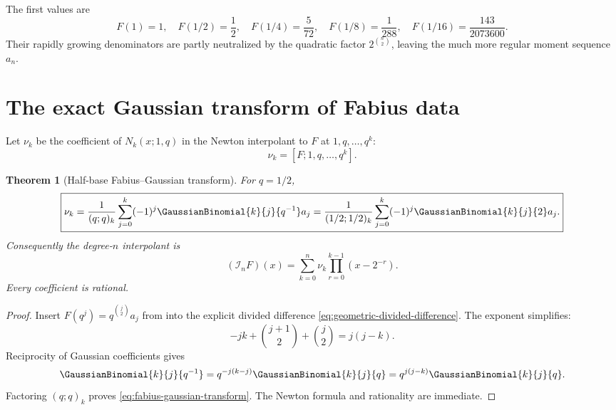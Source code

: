 \documentclass[11pt,oneside]{book}
\numberwithin{equation}{chapter}
\newtheorem{theorem}{Theorem}[chapter]
\theoremstyle{definition}
\theoremstyle{remark}
\newcommand{\twobinom}[2]{\GaussianBinomial{#1}{#2}{2}}
\newcommand{\Interp}{\mathcal I}
\begin{document}
The first values are
\begin{equation}
 F(1)=1,
 \quad F(1/2)=\frac12,
 \quad F(1/4)=\frac5{72},
 \quad F(1/8)=\frac1{288},
 \quad F(1/16)=\frac{143}{2073600}.
 \label{eq:first-fabius-values}
\end{equation}
Their rapidly growing denominators are partly neutralized by the quadratic
factor $2^{\binom n2}$, leaving the much more regular moment sequence $a_n$.

\section{The exact Gaussian transform of Fabius data}
\label{sec:fabius-newton-transform}

Let $\nu_k$ be the coefficient of $N_k(x;1,q)$ in the Newton interpolant to
$F$ at $1,q,\ldots,q^k$:
\begin{equation}
 \nu_k=[F;1,q,\ldots,q^k].
 \label{eq:fabius-nu-definition}
\end{equation}

\begin{theorem}[Half-base Fabius--Gaussian transform]
\label{thm:fabius-gaussian-transform}
For $q=1/2$,
\begin{equation}
 \boxed{
 \nu_k=\frac1{(q;q)_k}
 \sum_{j=0}^{k}(-1)^j
 \GaussianBinomial{k}{j}{q^{-1}}a_j
 =\frac1{(1/2;1/2)_k}
 \sum_{j=0}^{k}(-1)^j\twobinom{k}{j}a_j.}
 \label{eq:fabius-gaussian-transform}
\end{equation}
Consequently the degree-$n$ interpolant is
\begin{equation}
 \boxed{
 (\Interp_nF)(x)=\sum_{k=0}^{n}\nu_k
 \prod_{r=0}^{k-1}(x-2^{-r}).}
 \label{eq:fabius-newton-expansion}
\end{equation}
Every coefficient is rational.
\end{theorem}

\begin{proof}
Insert $F(q^j)=q^{\binom j2}a_j$ from
 into the explicit divided difference
\eqref{eq:geometric-divided-difference}.  The exponent simplifies:
\[
 -jk+\binom{j+1}{2}+\binom j2=j(j-k).
\]
Reciprocity of Gaussian coefficients gives
\[
 \GaussianBinomial{k}{j}{q^{-1}}
 =q^{-j(k-j)}\GaussianBinomial{k}{j}{q}=q^{j(j-k)}\GaussianBinomial{k}{j}{q}.
\]
Factoring $(q;q)_k$ proves \eqref{eq:fabius-gaussian-transform}.  The Newton
formula and rationality are immediate.
\end{proof}
\end{document}
